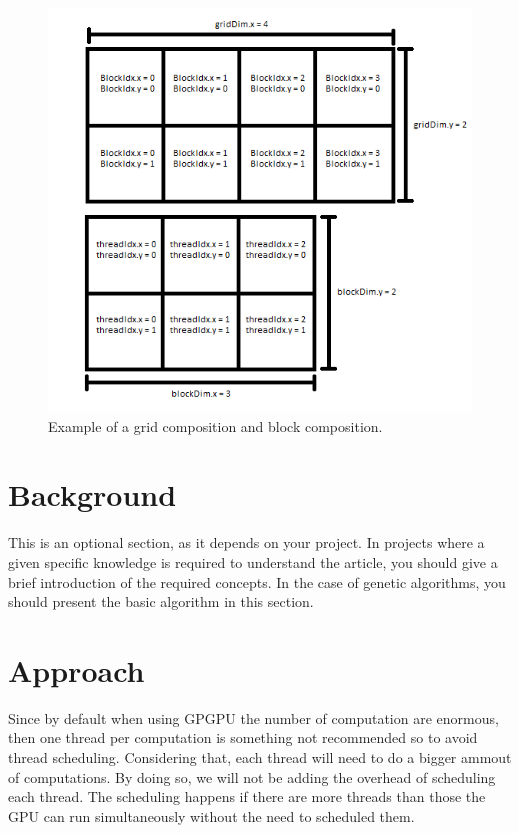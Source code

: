 \documentclass[conference]{IEEEtran}
\begin{document}
\begin{figure}[htbp]
	\centerline{\includegraphics[width=\linewidth]{figures/gridExampleTransparant.png}}
	\caption{Example of a grid composition and block composition.}
	\label{fig1}
\end{figure}

\section{Background}

This is an optional section, as it depends on your project. In projects where a given specific knowledge is required to understand the article, you should give a brief introduction of the required concepts. In the case of genetic algorithms, you should present the basic algorithm in this section.


\section{Approach}
Since by default when using GPGPU the number of computation are enormous, then one thread per computation is something not recommended so to avoid thread scheduling. Considering that, each thread will need to do a bigger ammout of computations. By doing so, we will not be adding the overhead of scheduling each thread. The scheduling happens if there are more threads than those the GPU can run simultaneously without the need to scheduled them.
\end{document}

